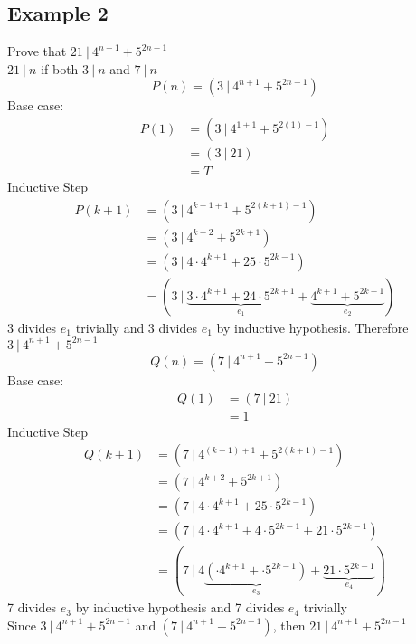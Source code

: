 \documentclass{article}
\theoremstyle{mytheoremstyle}
\theoremstyle{mytheoremstyle}
\theoremstyle{myproblemstyle}
\begin{document}
    \subsection*{Example 2}
    Prove that $21\ |\ 4^{n+1} + 5^{2n-1}$ \\
    $21\ |\ n$ if both  $3\ |\ n$ and $7\ |\ n$
    \[
        P(n) = (3\ |\ 4^{n+1} + 5^{2n-1})
    \]
    Base case:
    \begin{align*}
        P(1) &= (3\ |\ 4^{1+1} + 5^{2(1)-1}) \\
             &= (3\ |\ 21) \\
             &= T
    \end{align*}
    Inductive Step
    \begin{align*}
        P(k+1) &= (3\ |\ 4^{k+1+1} + 5^{2(k+1) - 1}) \\
               &= (3\ |\ 4^{k+2} + 5^{2k + 1}) \\
               &= (3\ |\ 4 \cdot 4^{k+1} + 25 \cdot 5^{2k - 1}) \\
               &= (3\ |\ 
               \underbrace{3\cdot 4^{k+1} + 24\cdot 5^{2k+1}}_{e_1}
             + \underbrace{4^{k+1} + 5^{2k-1}}_{e_2})
    \end{align*}
    3 divides $e_1$ trivially and 3 divides $e_1$ by inductive hypothesis.
    Therefore $3\ |\ 4^{n+1} + 5^{2n-1}$
    \[
        Q(n) = (7\ |\ 4^{n+1} + 5^{2n-1})
    \]
    Base case:
    \begin{align*}
        Q(1) &= (7\ |\ 21) \\
             &= 1
    \end{align*}
    Inductive Step
    \begin{align*}
        Q(k+1) &= (7\ |\ 4^{(k+1)+1} + 5^{2(k+1)-1}) \\
             &= (7\ |\ 4^{k + 2} + 5^{2k + 1}) \\
             &= (7\ |\ 4\cdot 4^{k + 1} + 25\cdot 5^{2k - 1}) \\
             &= (7\ |\ 4\cdot 4^{k + 1} + 4\cdot 5^{2k - 1} + 21\cdot 5^{2k - 1}) \\
             &= (7\ |\ 4\underbrace{(\cdot 4^{k + 1} + \cdot 5^{2k - 1})}_{e_3} + \underbrace{21\cdot 5^{2k - 1}}_{e_4})
    \end{align*}
    7 divides $e_3$ by inductive hypothesis and 7 divides $e_4$ trivially \\
    Since $3\ |\ 4^{n+1} + 5^{2n-1}$ and $(7\ |\ 4^{n+1} + 5^{2n-1})$, then
    $21\ |\ 4^{n+1} + 5^{2n-1}$
\end{document}
